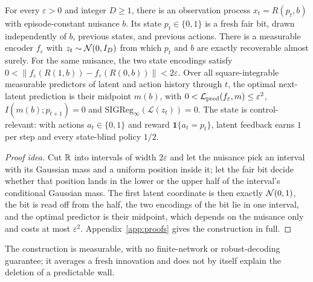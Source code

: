 \begin{proposition}
\label{prop:amplitude}
For every $\varepsilon>0$ and integer $D\ge1$, there is an observation process $x_t=R(p_t,b)$ with episode-constant nuisance $b$.
Its state $p_t\in\{0,1\}$ is a fresh fair bit, drawn independently of $b$, previous states, and previous actions.
There is a measurable encoder $f_\varepsilon$ with $z_t\sim\mathcal{N}(0,I_D)$ from which $p_t$ and $b$ are exactly recoverable almost surely.
For the same nuisance, the two state encodings satisfy
$0<\|f_\varepsilon(R(1,b))-f_\varepsilon(R(0,b))\|<2\varepsilon$.
Over all square-integrable measurable predictors of latent and action history through $t$, the optimal
next-latent prediction is their midpoint $m(b)$, with $0<\mathcal{L}_{\mathrm{pred}}(f_\varepsilon,m)\le\varepsilon^2$,
$I(m(b);p_{t+1})=0$ and $\mathrm{SIGReg}_\infty(\mathcal L(z_t))=0$.
The state is control-relevant: with actions $a_t\in\{0,1\}$ and reward $\mathbf1\{a_t=p_t\}$, latent
feedback earns $1$ per step and every state-blind policy $1/2$.
\end{proposition}
\begin{proof}[Proof idea]
Cut $\mathbb{R}$ into intervals of width $2\varepsilon$ and let the nuisance pick an interval with its Gaussian
mass and a uniform position inside it; let the fair bit decide whether that position lands in the lower
or the upper half of the interval's conditional Gaussian mass. The first latent coordinate is
then exactly $\mathcal{N}(0,1)$, the bit is read off from the half, the two encodings of the bit lie in one
interval, and the optimal predictor is their midpoint, which depends on the nuisance only and costs at
most $\varepsilon^2$. Appendix~\ref{app:proofs} gives the construction in full.
\end{proof}

The construction is measurable, with no finite-network or robust-decoding guarantee; it averages a
fresh innovation and does not by itself explain the deletion of a predictable wall.


